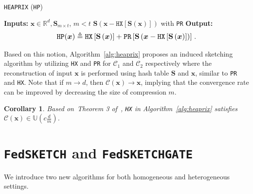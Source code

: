 \documentclass[sigconf, anonymous, review]{acmart}
\newtheorem{corollary}{Corollary}
\newcommand*{\Resize}[2]{\resizebox{#1}{!}{$#2$}}%
\begin{document}
\begin{algorithm}[H]
\caption{\texttt{HEAPRIX} (\texttt{HP}) }\label{alg:heaprix}
\begin{algorithmic}[1]
\STATE \textbf{Inputs:} $\boldsymbol{x}\in\mathbb{R}^{d}, \mathbf{S}_{m\times t}$, $m<t$
 $\mathbf{S}\left(\boldsymbol{x} - \texttt{HX}[\mathbf{S}(\boldsymbol{x})]\right)$ with \texttt{PR} 
\STATE \textbf{Output:}
\vspace{- 0.1cm}
\[ \Resize{7cm}{\texttt{HP}(\boldsymbol{x})\triangleq\texttt{HX}\left[\mathbf{S}\left(\boldsymbol{x}\right)\right]+\texttt{PR}\left[\mathbf{S}\left(\boldsymbol{x}-\texttt{HX}\left[\mathbf{S}\left(\boldsymbol{x}\right)\right]\right)\right]}\ .\]
\end{algorithmic}
\end{algorithm}
\vspace{-0.1in}
Based on this notion, Algorithm~\ref{alg:heaprix} proposes an induced sketching algorithm by utilizing \texttt{HX} and \texttt{PR} for $\mathcal{C}_1$ and $\mathcal{C}_2$ respectively where the reconstruction of input $\mathbf{x}$ is performed using hash table $\mathbf{S}$ and $\mathbf{x}$, similar to \texttt{PR} and \texttt{HX}.
Note that if $m\rightarrow d$, then $\mathcal{C}(\boldsymbol{x})\rightarrow \boldsymbol{x}$, implying that the convergence rate  can be improved by decreasing the size of compression $m$. 
\begin{corollary}\label{cor:small}
Based on~Theorem 3 of~\citep{horvath2020better}, \texttt{HX} in Algorithm~\ref{alg:heaprix} satisfies $\mathcal{C}(\boldsymbol{x})\in \mathbb{U}(c \frac{d}{m})$. 
\end{corollary}


\section{\texttt{FedSKETCH} and \texttt{FedSKETCHGATE}}\label{sec:algos}

We introduce two new algorithms for both homogeneous and heterogeneous settings.
\end{document}
